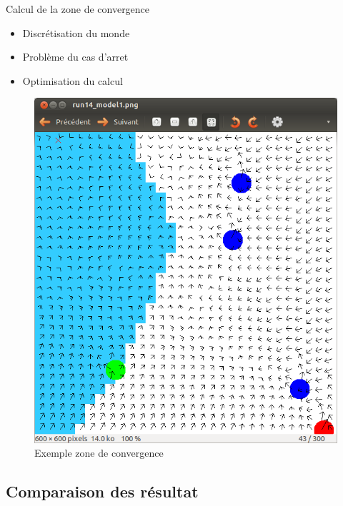\documentclass{beamer}
\begin{document}
\begin{frame}
  \begin{block}{Calcul de la zone de convergence}
    \begin{itemize}
      \item Discrétisation du monde
      \item Problème du cas d'arret
      \item Optimisation du calcul
    \end{itemize}
  \end{block}
  \begin{figure}
    \centering
    \includegraphics[scale=0.2]{exp.png}
    \caption{Exemple zone de convergence}
  \end{figure}
\end{frame}

\subsection{Comparaison des résultat}
\end{document}
